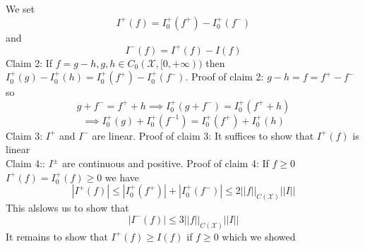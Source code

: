 \documentclass[11pt]{article}
\begin{document}
We set
\[
I^{+}(f) = I_0^{+}(f^{+}) - I_0^{+}(f^{-})
\] 
and
\[
I^{-}(f) = I^{+}(f) - I(f)
\] 
Claim 2:  If $f = g - h, g,h \in C_0 ( \mathcal{X},[0,+\infty))$ 
then $I^{+}_0(g) - I_0^{+}(h) = I_0^{+}(f^{+}) - I_0^{+}(f^{-})$.
Proof of claim 2: $g-h = f = f^{+} - f^{-}$  so
\[
g + f^{-} = f^{+} + h \implies I_0^{+}(g + f^{-}) = I_0^{+}(f^{+} + h)
\] 
\[
\implies I_0^{+}(g) + I_0^{+}(f^{-1}) =  I_0^{+}(f^{+}) + I_0^{+}(h)
\] 
Claim 3: $I^{+}$ and $I^{-}$ are linear.
Proof of claim 3: It suffices to show that $I^{+}(f)$ is linear\\
Claim 4:: $I^{\pm}$ are continuous and positive.
Proof of claim 4: If $f \ge 0$  $I^{+}(f) = I_0^{+}(f) \ge 0$
we have
\[
    |I^{+}(f)| \le |I_0^{+}(f^{+})| + |I_0^{+}(f^{-})| \le 2||f||_{C( \mathcal{X})}||I||
\] 
This alslows us to show that
\[
    |I^{-}(f)| \le 3||f||_{C( \mathcal{X})} ||I||
\] 
It remains to show that $I^{+}(f) \ge I(f)$ if $f \ge 0$ which we showed
\end{document}
